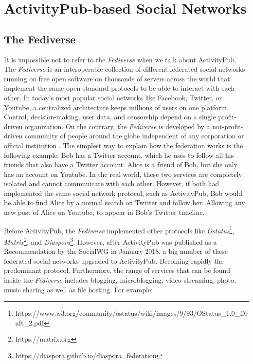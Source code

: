 \section{ActivityPub-based Social Networks}

\subsection{The Fediverse}

It is impossible not to refer to the \emph{Fediverse} when we talk about ActivityPub. The \emph{Fediverse} is an interoperable collection of different federated social networks running on free open software on thousands of servers across the world that implement the same open-standard protocols to be able to interact with each other. In today's most popular social networks like Facebook, Twitter, or Youtube, a centralized architecture keeps millions of users on one platform. Control, decision-making, user data, and censorship depend on a single profit-driven organization. On the contrary, the \emph{Fediverse} is developed by a not-profit-driven community of people around the globe independent of any corporation or official institution \cite{holloway_2018} \cite{https://doi.org/10.48550/arxiv.1909.05801}. The simplest way to explain how the federation works is the following example: Bob has a Twitter account, which he uses to follow all his friends that also have a Twitter account. Alice is a friend of Bob, but she only has an account on Youtube. In the real world, these two services are completely isolated and cannot communicate with each other. However, if both had implemented the same social network protocol, such as ActivityPub, Bob would be able to find Alice by a normal search on Twitter and follow her. Allowing any new post of Alice on Youtube, to appear in Bob's Twitter timeline.

Before ActivityPub, the \emph{Fediverse} implemented other protocols like \emph{Ostatus}\footnote{https://www.w3.org/community/ostatus/wiki/images/9/93/OStatus\_1.0\_Draft\_2.pdf}, \emph{Matrix}\footnote{https://matrix.org}, and \emph{Diaspora}\footnote{https://diaspora.github.io/diaspora\_federation}. However, after ActivityPub was published as a Recommendation by the SocialWG in January 2018, a big number of these federated social networks upgraded to ActivityPub. Becoming rapidly the predominant protocol. Furthermore, the range of services that can be found inside the \emph{Fediverse} includes blogging, microblogging, video streaming, photo, music sharing as well as file hosting. For example: 

